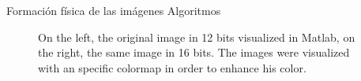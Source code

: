 Formación física de las imágenes
Algoritmos

\begin{figure}[h!]
  \begin{center}
    \hspace{\fill}
    \hfill
    \hspace{\fill}
  \caption{On the left, the original image in 12 bits visualized in Matlab, on
  the right, the same image in 16 bits. The images were visualized with an
  specific colormap in order to enhance his color.} 
  \end{center}
  \label{bitconversionimage} 
\end{figure}


